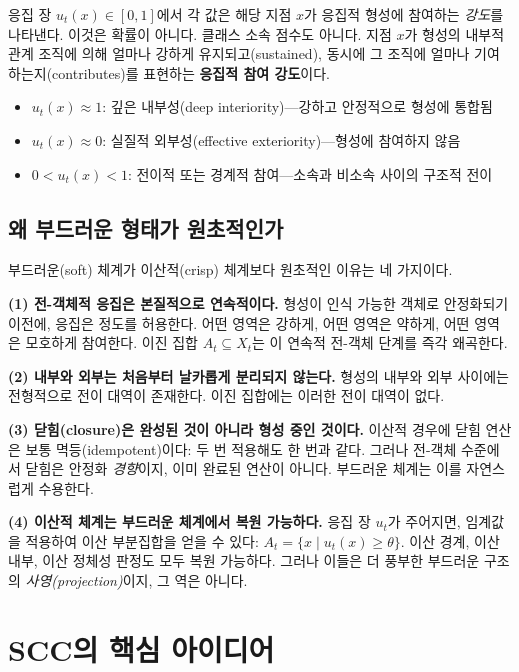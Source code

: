 응집 장 $u_t(x) \in [0,1]$에서 각 값은 해당 지점 $x$가 응집적 형성에 참여하는 \emph{강도}를 나타낸다. 이것은 확률이 아니다. 클래스 소속 점수도 아니다. 지점 $x$가 형성의 내부적 관계 조직에 의해 얼마나 강하게 유지되고(sustained), 동시에 그 조직에 얼마나 기여하는지(contributes)를 표현하는 \textbf{응집적 참여 강도}이다.

\begin{itemize}
    \item $u_t(x) \approx 1$: 깊은 내부성(deep interiority)---강하고 안정적으로 형성에 통합됨
    \item $u_t(x) \approx 0$: 실질적 외부성(effective exteriority)---형성에 참여하지 않음
    \item $0 < u_t(x) < 1$: 전이적 또는 경계적 참여---소속과 비소속 사이의 구조적 전이
\end{itemize}

\subsection{왜 부드러운 형태가 원초적인가}

부드러운(soft) 체계가 이산적(crisp) 체계보다 원초적인 이유는 네 가지이다.

\textbf{(1) 전-객체적 응집은 본질적으로 연속적이다.} 형성이 인식 가능한 객체로 안정화되기 이전에, 응집은 정도를 허용한다. 어떤 영역은 강하게, 어떤 영역은 약하게, 어떤 영역은 모호하게 참여한다. 이진 집합 $A_t \subseteq X_t$는 이 연속적 전-객체 단계를 즉각 왜곡한다.

\textbf{(2) 내부와 외부는 처음부터 날카롭게 분리되지 않는다.} 형성의 내부와 외부 사이에는 전형적으로 전이 대역이 존재한다. 이진 집합에는 이러한 전이 대역이 없다.

\textbf{(3) 닫힘(closure)은 완성된 것이 아니라 형성 중인 것이다.} 이산적 경우에 닫힘 연산은 보통 멱등(idempotent)이다: 두 번 적용해도 한 번과 같다. 그러나 전-객체 수준에서 닫힘은 안정화 \emph{경향}이지, 이미 완료된 연산이 아니다. 부드러운 체계는 이를 자연스럽게 수용한다.

\textbf{(4) 이산적 체계는 부드러운 체계에서 복원 가능하다.} 응집 장 $u_t$가 주어지면, 임계값을 적용하여 이산 부분집합을 얻을 수 있다: $A_t = \{x \mid u_t(x) \geq \theta\}$. 이산 경계, 이산 내부, 이산 정체성 판정도 모두 복원 가능하다. 그러나 이들은 더 풍부한 부드러운 구조의 \emph{사영(projection)}이지, 그 역은 아니다.


\section{SCC의 핵심 아이디어}
\label{sec:scc-core-ideas}

